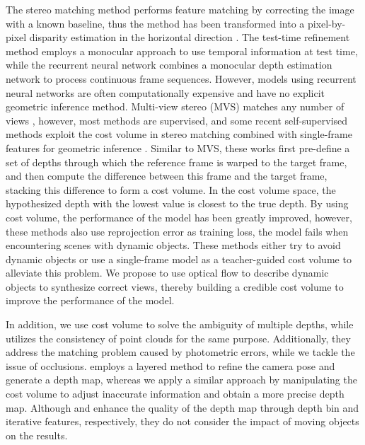 \documentclass[journal]{IEEEtran}
\begin{document}
The stereo matching method performs feature matching by correcting the image with a known baseline, thus the method has been transformed into a pixel-by-pixel disparity estimation in the horizontal direction \cite{kendall2017end, liang2018learning}. The test-time refinement method employs a monocular approach to use temporal information at test time, while the recurrent neural network combines a monocular depth estimation network to process continuous frame sequences. However, models using recurrent neural networks are often computationally expensive and have no explicit geometric inference method. Multi-view stereo (MVS) matches any number of views \cite{long2021multi,huang2018deepmvs,im2019dpsnet,yao2018mvsnet, kendall2017end, liang2018learning}, however, most methods are supervised, and some recent self-supervised methods exploit the cost volume in stereo matching combined with single-frame features for geometric inference \cite{manydepth,wimbauer2021monorec,feng2022disentangling,guizilini2022multi,hwang2022self}. Similar to MVS, these works first pre-define a set of depths through which the reference frame is warped to the target frame, and then compute the difference between this frame and the target frame, stacking this difference to form a cost volume. In the cost volume space, the hypothesized depth with the lowest value is closest to the true depth. By using cost volume, the performance of the model has been greatly improved, however, these methods also use reprojection error as training loss, the model fails when encountering scenes with dynamic objects. These methods either try to avoid dynamic objects or use a single-frame model as a teacher-guided cost volume to alleviate this problem. We propose to use optical flow to describe dynamic objects to synthesize correct views, thereby building a credible cost volume to improve the performance of the model. 

In addition, we use cost volume to solve the ambiguity of multiple depths, while \cite{chen2021fixing} utilizes the consistency of point clouds for the same purpose. Additionally, they address the matching problem caused by photometric errors, while we tackle the issue of occlusions. \cite{wang20223d} employs a layered method to refine the camera pose and generate a depth map, whereas we apply a similar approach by manipulating the cost volume to adjust inaccurate information and obtain a more precise depth map. Although \cite{jin2018depth} and \cite{wei2021iterative} enhance the quality of the depth map through depth bin and iterative features, respectively, they do not consider the impact of moving objects on the results.
\end{document}
